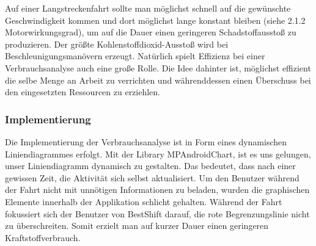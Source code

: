 Auf einer Langstreckenfahrt sollte man möglichst schnell auf die gewünschte Geschwindigkeit kommen und dort möglichst lange konstant bleiben (siehe 2.1.2 Motorwirkungsgrad), um auf die Dauer einen geringeren Schadstoffausstoß zu produzieren.
Der größte Kohlenstoffdioxid-Ausstoß wird bei Beschleunigungsmanövern erzeugt.
Natürlich spielt Effizienz bei einer Verbrauchsanalyse auch eine große Rolle.
Die Idee dahinter ist, möglichst effizient die selbe Menge an Arbeit zu verrichten und währenddessen einen Überschuss bei den eingesetzten Ressourcen zu erziehlen. 

\subsubsection{Implementierung}

Die Implementierung der Verbrauchsanalyse ist in Form eines dynamischen Liniendiagrammes erfolgt.
Mit der Library MPAndroidChart, ist es uns gelungen, unser Liniendiagramm dynamisch zu gestalten.
Das bedeutet, dass nach einer gewissen Zeit, die Aktivität sich selbst aktualisiert.
Um den Benutzer während der Fahrt nicht mit unnötigen Informationen zu beladen, wurden die graphischen
Elemente innerhalb der Applikation schlicht gehalten.
Während der Fahrt fokussiert sich der Benutzer von BestShift darauf, die rote Begrenzungslinie nicht zu überschreiten.
Somit erzielt man auf kurzer Dauer einen geringeren Kraftstoffverbrauch.



\clearpage %
